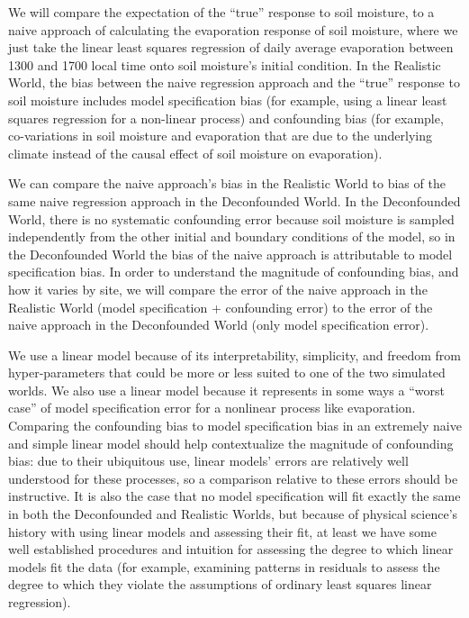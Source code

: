 We will compare the expectation of the ``true'' response to soil
moisture, to a naive approach of calculating the evaporation response
of soil moisture, where we just take the linear least squares
regression of daily average evaporation between 1300 and 1700 local
time onto soil moisture's initial condition. In the Realistic World,
the bias between the naive regression approach and the ``true''
response to soil moisture includes model specification bias (for
example, using a linear least squares regression for a non-linear
process) and confounding bias (for example, co-variations in soil
moisture and evaporation that are due to the underlying climate
instead of the causal effect of soil moisture on evaporation).

We can compare the naive approach's bias in the Realistic World to
bias of the same naive regression approach in the Deconfounded
World. In the Deconfounded World, there is no systematic confounding
error because soil moisture is sampled independently from the other
initial and boundary conditions of the model, so in the Deconfounded
World the bias of the naive approach is attributable to model
specification bias. In order to understand the magnitude of
confounding bias, and how it varies by site, we will compare the error
of the naive approach in the Realistic World (model specification +
confounding error) to the error of the naive approach in the
Deconfounded World (only model specification error).

We use a linear model because of its interpretability, simplicity, and
freedom from hyper-parameters that could be more or less suited to one
of the two simulated worlds. We also use a linear model because it
represents in some ways a ``worst case'' of model specification error
for a nonlinear process like evaporation. Comparing the confounding
bias to model specification bias in an extremely naive and simple
linear model should help contextualize the magnitude of confounding
bias: due to their ubiquitous use, linear models' errors are
relatively well understood for these processes, so a comparison
relative to these errors should be instructive. It is also the case
that no model specification will fit exactly the same in both the
Deconfounded and Realistic Worlds, but because of physical science's
history with using linear models and assessing their
fit\cite{shalizi2013}, at least we have some well established
procedures and intuition for assessing the degree to which linear
models fit the data (for example, examining patterns in residuals to
assess the degree to which they violate the assumptions of ordinary
least squares linear regression).

